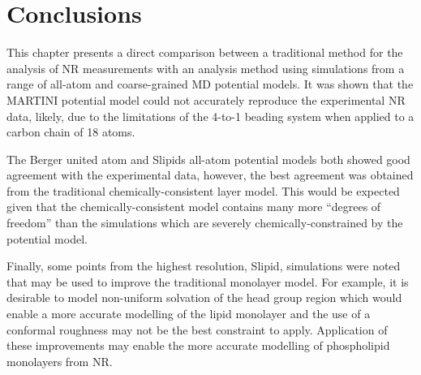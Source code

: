 \section{Conclusions}
This chapter presents a direct comparison between a traditional method for the analysis of NR measurements with an analysis method using simulations from a range of all-atom and coarse-grained MD potential models.
It was shown that the MARTINI potential model could not accurately reproduce the experimental NR data, likely, due to the limitations of the 4-to-1 beading system when applied to a carbon chain of 18 atoms.

The Berger united atom and Slipids all-atom potential models both showed good agreement with the experimental data, however, the best agreement was obtained from the traditional chemically-consistent layer model.
This would be expected given that the chemically-consistent model contains many more ``degrees of freedom'' than the simulations which are severely chemically-constrained by the potential model.

Finally, some points from the highest resolution, Slipid, simulations were noted that may be used to improve the traditional monolayer model.
For example, it is desirable to model non-uniform solvation of the head group region which would enable a more accurate modelling of the lipid monolayer and the use of a conformal roughness may not be the best constraint to apply.
Application of these improvements may enable the more accurate modelling of phospholipid monolayers from NR.
